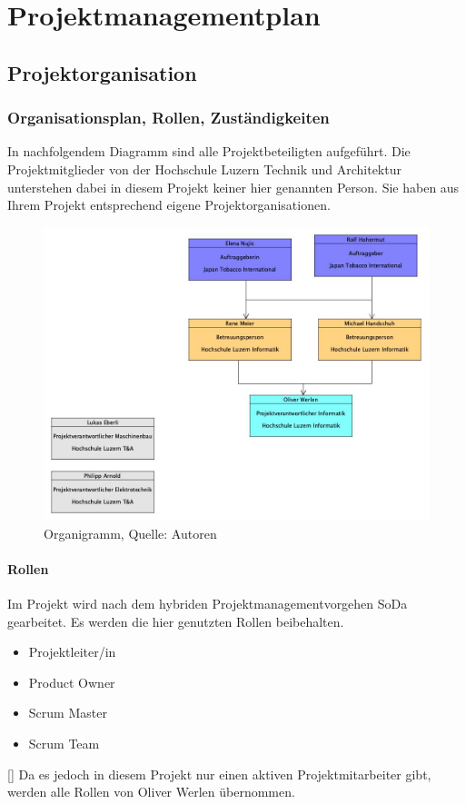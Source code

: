 
\section{Projektmanagementplan}

\subsection{Projektorganisation}
\subsubsection{Organisationsplan, Rollen, Zuständigkeiten}
In nachfolgendem Diagramm sind alle Projektbeteiligten aufgeführt. Die Projektmitglieder von der Hochschule Luzern Technik und Architektur unterstehen dabei in diesem Projekt keiner hier genannten Person. Sie haben aus Ihrem Projekt entsprechend eigene Projektorganisationen. 
\begin{figure}[H]
    \centering
    \includegraphics[width=1\textwidth]{images/Organigramm_BAA.jpg}
    \caption[Organigramm]{Organigramm, Quelle: Autoren}
    \label{img: OrganigrammWiPro}
\end{figure}	

\paragraph{Rollen}
Im Projekt wird nach dem hybriden Projektmanagementvorgehen \ac{SoDa} gearbeitet. Es werden die hier genutzten Rollen beibehalten. 
\begin{itemize}
	\item Projektleiter/in
	\item Product Owner
	\item Scrum Master
	\item Scrum Team
\end{itemize}
[\cite{sodaHSLU}]
Da es jedoch in diesem Projekt nur einen aktiven Projektmitarbeiter gibt, werden alle Rollen von Oliver Werlen übernommen. 
